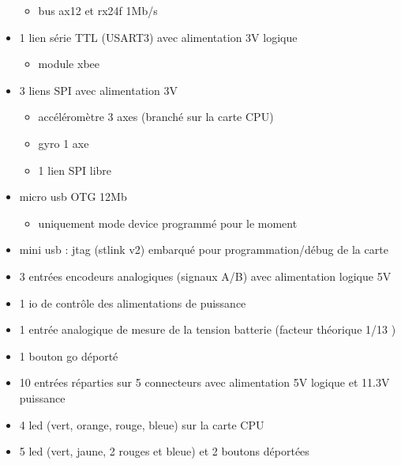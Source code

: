 \begin{itemize}
		\begin{itemize}
			\item bus ax12 et rx24f 1Mb/s
		\end{itemize}
	\item 1 lien série TTL (USART3) avec alimentation 3V logique
		\begin{itemize}
			\item module xbee
		\end{itemize}
	\item 3 liens SPI avec alimentation 3V
		\begin{itemize}
			\item accéléromètre 3 axes (branché sur la carte CPU)
			\item gyro 1 axe
			\item 1 lien SPI libre
		\end{itemize}
	\item micro usb OTG 12Mb
		\begin{itemize}
			\item uniquement mode device programmé pour le moment
		\end{itemize}
	\item mini usb : jtag (stlink v2) embarqué pour programmation/débug de la carte
	\item 3 entrées encodeurs analogiques (signaux A/B) avec alimentation logique 5V
	\item 1 io de contrôle des alimentations de puissance
	\item 1 entrée analogique de mesure de la tension batterie (facteur théorique 1/13 )
	\item 1 bouton go déporté
	\item 10 entrées réparties sur 5 connecteurs avec alimentation 5V logique et 11.3V puissance
	\item 4 led (vert, orange, rouge, bleue) sur la carte CPU
	\item 5 led (vert, jaune, 2 rouges et bleue) et 2 boutons déportées
\end{itemize}

\clearpage
